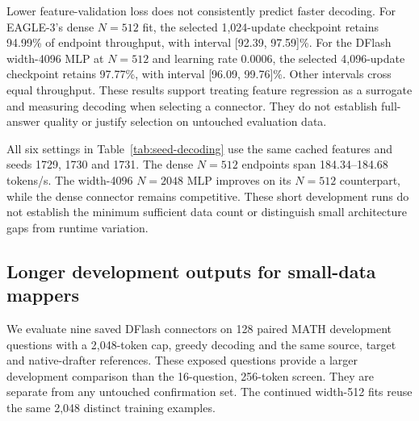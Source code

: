 \documentclass{article}
\begin{document}
Lower feature-validation loss does not consistently predict faster decoding.
For EAGLE-3's dense $N=512$ fit, the selected 1,024-update checkpoint
retains 94.99\% of endpoint throughput, with interval [92.39, 97.59]\%.
For the DFlash width-4096 MLP at $N=512$ and learning rate 0.0006,
the selected 4,096-update checkpoint retains 97.77\%, with interval
[96.09, 99.76]\%. Other intervals cross equal throughput. These results
support treating feature regression as a surrogate and measuring decoding
when selecting a connector. They do not establish full-answer quality
or justify selection on untouched evaluation data.

\begin{table}[H]
\caption{Observed throughput ranges across three fitting seeds in a
separate 16-question, 256-token development campaign. Selected uses each
fit's minimum saved feature-validation checkpoint. These ranges describe
the three measured fits and runtime variation, not confidence intervals.}
\label{tab:seed-decoding}
\centering\footnotesize
\setlength{\tabcolsep}{4pt}

\end{table}

All six settings in Table~\ref{tab:seed-decoding} use the same cached
features and seeds 1729, 1730 and 1731. The dense $N=512$ endpoints
span 184.34--184.68 tokens/s. The width-4096 $N=2048$ MLP improves on its
$N=512$ counterpart, while the dense connector remains competitive.
These short development runs do not establish the minimum sufficient
data count or distinguish small architecture gaps from runtime variation.

\subsection{Longer development outputs for small-data mappers}

We evaluate nine saved DFlash connectors on 128 paired MATH development
questions with a 2,048-token cap, greedy decoding and the same source,
target and native-drafter references. These exposed questions provide a
larger development comparison than the 16-question, 256-token screen.
They are separate from any untouched confirmation set. The continued
width-512 fits reuse the same 2,048 distinct training examples.

\begin{table}[H]
\caption{Capped development outcomes for small-data DFlash fitting.
Throughput retention uses the dense $N=2048$, 8,192-update connector.
Intervals use 10,000 paired request bootstrap samples. Correct counts
scored answers. Cap counts outputs reaching 2,048 tokens, which can include
EOS exactly at the limit and are not exact truncation counts.}
\label{tab:small-quality}
\centering\footnotesize
\setlength{\tabcolsep}{3pt}

\end{table}
\end{document}

